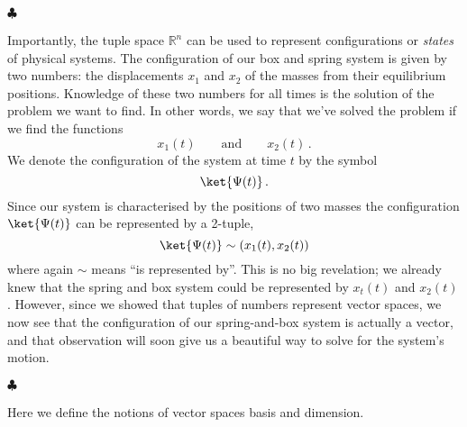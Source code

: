 \begin{flushleft} $\clubsuit$ \end{flushleft}
Importantly, the tuple space $\mathbb{R}^n$ can be used to represent configurations or \textit{states} of physical systems.
The configuration of our box and spring system is given by two numbers: the displacements $x_1$ and $x_2$ of the masses from their equilibrium positions.
Knowledge of these two numbers for all times is the solution of the problem we want to find.
In other words, we say that we've solved the problem if we find the functions
\begin{equation*}
x_{1}(t) \qquad \textrm{and} \qquad x_{2}(t) \, .
\end{equation*}
We denote the configuration of the system at time $t$ by the symbol
\begin{displaymath}
\ket{\Psi (t)} \, .
\end{displaymath}
Since our system is characterised by the positions of two masses the configuration $\ket{\Psi (t)}$ can be represented by a 2-tuple,
\begin{equation} \label{eq:Psirep}
\ket{\Psi (t)} \sim (x_{1}(t),x_2(t))
\end{equation}
where again $\sim$ means ``is represented by''.
This is no big revelation; we already knew that the spring and box system could be represented by $x_t(t)$ and $x_2(t)$.
However, since we showed that tuples of numbers represent vector spaces, we now see that the configuration of our spring-and-box system is actually a vector, and that observation will soon give us a beautiful way to solve for the system's motion.
\begin{flushright} $\clubsuit$ \end{flushright}


Here we define the notions of vector spaces basis and dimension.

